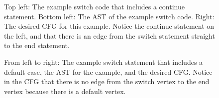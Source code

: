 \begin{figure}
\centering
\begin{minipage}{.6\textwidth}
  \centering
  
\end{minipage}%
\begin{minipage}{.3\textwidth}
  \centering
\end{minipage}
\caption{Top left: The example switch code that includes a continue statement. Bottom left: The AST of the example switch code. Right: The desired CFG for this example. Notice the continue statement on the left, and that there is an edge from the switch statement straight to the end statement.}
\label{fig:switch1}
\end{figure}

\begin{figure}
\centering
\begin{minipage}{.3\textwidth}
  \centering
  
\end{minipage}%
\begin{minipage}{.3\textwidth}
  \centering
\end{minipage}
\begin{minipage}{.3\textwidth}
  \centering
\end{minipage}
\caption{From left to right: The example switch statement that includes a default case, the AST for the example, and the desired CFG. Notice in the CFG that there is no edge from the switch vertex to the end vertex because there is a default vertex.}
\label{fig:switch2}
\end{figure}
